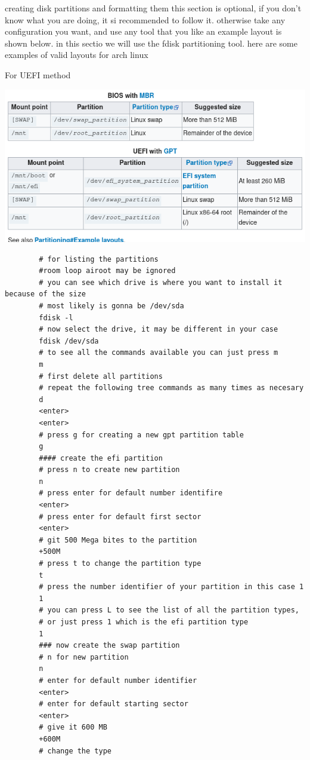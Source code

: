 \begin{section}{creating disk partitions and formatting them}
	this section is optional, if you don't know what you are doing, it si recommended to follow it.
	otherwise take any configuration you want, and use any tool that you like
	an example layout is shown below.
	in this sectio we will use the fdisk partitioning tool.
	here are some examples of valid layouts for arch linux
	\begin{Large}
		\begin{center}
			For UEFI method
		\end{center}
	\end{Large}
	\includegraphics{partitionTablesExamples.png}
	\begin{verbatim}
		# for listing the partitions
		#room loop airoot may be ignored
		# you can see which drive is where you want to install it because of the size
		# most likely is gonna be /dev/sda
		fdisk -l
		# now select the drive, it may be different in your case
		fdisk /dev/sda
		# to see all the commands available you can just press m
		m
		# first delete all partitions
		# repeat the following tree commands as many times as necesary
		d
		<enter>
		<enter>
		# press g for creating a new gpt partition table
		g
		#### create the efi partition 
		# press n to create new partition
		n
		# press enter for default number identifire
		<enter>
		# press enter for default first sector
		<enter>
		# git 500 Mega bites to the partition
		+500M
		# press t to change the partition type
		t
		# press the number identifier of your partition in this case 1
		1
		# you can press L to see the list of all the partition types,
		# or just press 1 which is the efi partition type
		1
		### now create the swap partition
		# n for new partition
		n
		# enter for default number identifier
		<enter>
		# enter for default starting sector
		<enter>
		# give it 600 MB
		+600M
		# change the type

\end{verbatim}
\end{section}
